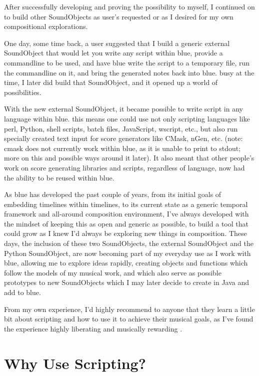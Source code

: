 After successfully developing and proving the possibility to myself, I
continued on to build other SoundObjects as user's requested or as I
desired for my own compositional explorations.

One day, some time back, a user suggested that I build a generic
external SoundObject that would let you write any script within blue,
provide a commandline to be used, and have blue write the script to a
temporary file, run the commandline on it, and bring the generated notes
back into blue. busy at the time, I later did build that SoundObject,
and it opened up a world of possibilities.

With the new external SoundObject, it became possible to write script in
any language within blue. this means one could use not only scripting
languages like perl, Python, shell scripts, batch files, JavaScript,
wscript, etc., but also run specially created text input for score
generators like CMask, nGen, etc. (note: cmask does not currently work
within blue, as it is unable to print to stdout; more on this and
possible ways around it later). It also meant that other people's work
on score generating libraries and scripts, regardless of language, now
had the ability to be reused within blue.

As blue has developed the past couple of years, from its initial goals
of embedding timelines within timelines, to its current state as a
generic temporal framework and all-around composition environment, I've
always developed with the mindset of keeping this as open and generic as
possible, to build a tool that could grow as I knew I'd always be
exploring new things in composition. These days, the inclusion of these
two SoundObjects, the external SoundObject and the Python SoundObject,
are now becoming part of my everyday use as I work with blue, allowing
me to explore ideas rapidly, creating objects and functions which follow
the models of my musical work, and which also serve as possible
prototypes to new SoundObjects which I may later decide to create in
Java and add to blue.

From my own experience, I'd highly recommend to anyone that they learn a
little bit about scripting and how to use it to achieve their musical
goals, as I've found the experience highly liberating and musically
rewarding .

\section{Why Use Scripting?}

